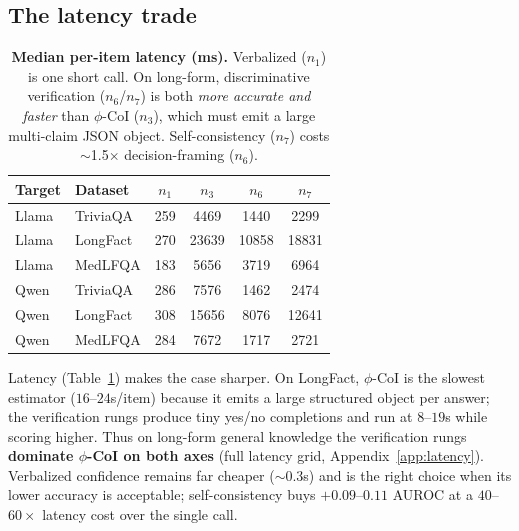 \documentclass[11pt]{article}
\newcommand{\nverb}{$n_1$}     %
\newcommand{\nphi}{$n_3$}      %
\newcommand{\nyn}{$n_6$}       %
\newcommand{\nsc}{$n_7$}       %
\begin{document}
\subsection{The latency trade}
\begin{table}[t]
\centering\small
\begin{tabular}{llcccc}
\toprule
Target & Dataset & \nverb & \nphi & \nyn & \nsc \\
\midrule
Llama & TriviaQA & 259 & 4469 & 1440 & 2299 \\
Llama & LongFact & 270 & 23639 & 10858 & 18831 \\
Llama & MedLFQA  & 183 & 5656 & 3719 & 6964 \\
\midrule
Qwen  & TriviaQA & 286 & 7576 & 1462 & 2474 \\
Qwen  & LongFact & 308 & 15656 & 8076 & 12641 \\
Qwen  & MedLFQA  & 284 & 7672 & 1717 & 2721 \\
\bottomrule
\end{tabular}
\caption{\textbf{Median per-item latency (ms).} Verbalized (\nverb) is one short call.
On long-form, discriminative verification (\nyn/\nsc) is both \emph{more accurate and
faster} than $\phi$-CoI (\nphi), which must emit a large multi-claim JSON object.
Self-consistency (\nsc) costs $\sim$1.5$\times$ decision-framing (\nyn).}
\label{tab:latency}
\end{table}
Latency (Table~\ref{tab:latency}) makes the case sharper. On LongFact, $\phi$-CoI is the
slowest estimator ($16$--$24$s/item) because it emits a large structured object per
answer; the verification rungs produce tiny yes/no completions and run at $8$--$19$s while
scoring higher. Thus on long-form general knowledge the verification rungs
\textbf{dominate $\phi$-CoI on both axes} (full latency grid, Appendix~\ref{app:latency}).
Verbalized confidence remains far cheaper
($\sim$0.3s) and is the right choice when its lower accuracy is acceptable; self-consistency
buys $+0.09$--$0.11$ AUROC at a $40$--$60\times$ latency cost over the single call.
\end{document}
